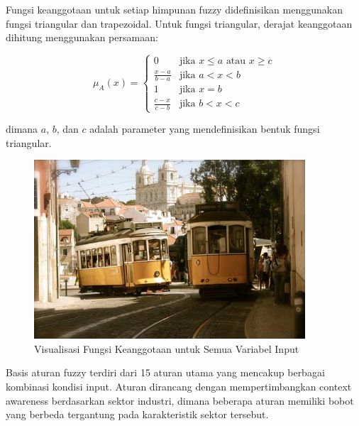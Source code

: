 \documentclass[12pt,a4paper]{article}
\begin{document}
Fungsi keanggotaan untuk setiap himpunan fuzzy didefinisikan menggunakan fungsi triangular dan trapezoidal. Untuk fungsi triangular, derajat keanggotaan dihitung menggunakan persamaan:

\begin{equation}
\mu_A(x) = \begin{cases}
0 & \text{jika } x \leq a \text{ atau } x \geq c \\
\frac{x-a}{b-a} & \text{jika } a < x < b \\
1 & \text{jika } x = b \\
\frac{c-x}{c-b} & \text{jika } b < x < c
\end{cases}
\end{equation}

dimana $a$, $b$, dan $c$ adalah parameter yang mendefinisikan bentuk fungsi triangular.

\begin{figure}[H]
    \centering
    \includegraphics[width=0.9\textwidth]{assets/image.png}
    \caption{Visualisasi Fungsi Keanggotaan untuk Semua Variabel Input}
    \label{fig:membership}
\end{figure}

Basis aturan fuzzy terdiri dari 15 aturan utama yang mencakup berbagai kombinasi kondisi input. Aturan dirancang dengan mempertimbangkan context awareness berdasarkan sektor industri, dimana beberapa aturan memiliki bobot yang berbeda tergantung pada karakteristik sektor tersebut.
\end{document}
